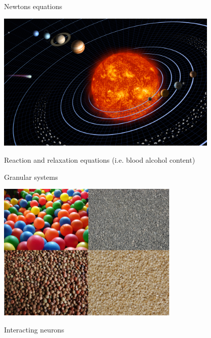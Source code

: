 \begin{frame}
 

\vspace{2ex}

\begin{minipage}{0.48\textwidth}
 \begin{center}
  Newtons equations

  \includegraphics[draft=false,width=0.8\textwidth]{solar_system.jpg}
 \end{center}
\end{minipage}
\begin{minipage}{0.48\textwidth}
 \begin{center}
  Reaction and relaxation equations (i.e. blood alcohol content)
 \end{center}
\end{minipage}

\vspace{2ex}

\begin{minipage}{0.48\textwidth}
 \begin{center}
  Granular systems

  \includegraphics[draft=false,width=0.65\textwidth]{granular_system.png}
 \end{center}
\end{minipage}
\begin{minipage}{0.48\textwidth}
 \begin{center}
  Interacting neurons


\end{center}
\end{minipage}
\end{frame}
